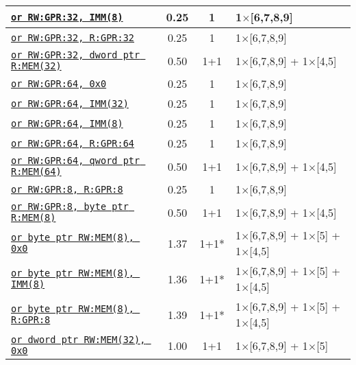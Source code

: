 \documentclass[a4paper,english,fontsize=9]{scrartcl}
\begin{document}
\begin{longtable}{p{}ccL{.25\textwidth}}
  \midrule
  \texttt{\href{https://felixcloutier.com/x86/OR.html}{or RW:GPR:32, IMM(8)}} & 0.25 & 1 & 1\(\times\)[6,7,8,9] \\
  \midrule
  \texttt{\href{https://felixcloutier.com/x86/OR.html}{or RW:GPR:32, R:GPR:32}} & 0.25 & 1 & 1\(\times\)[6,7,8,9] \\
  \midrule
  \texttt{\href{https://felixcloutier.com/x86/OR.html}{or RW:GPR:32, dword ptr R:MEM(32)}} & 0.50 & 1+1 & 1\(\times\)[6,7,8,9] + 1\(\times\)[4,5] \\
  \midrule
  \texttt{\href{https://felixcloutier.com/x86/OR.html}{or RW:GPR:64, 0x0}} & 0.25 & 1 & 1\(\times\)[6,7,8,9] \\
  \midrule
  \texttt{\href{https://felixcloutier.com/x86/OR.html}{or RW:GPR:64, IMM(32)}} & 0.25 & 1 & 1\(\times\)[6,7,8,9] \\
  \midrule
  \texttt{\href{https://felixcloutier.com/x86/OR.html}{or RW:GPR:64, IMM(8)}} & 0.25 & 1 & 1\(\times\)[6,7,8,9] \\
  \midrule
  \texttt{\href{https://felixcloutier.com/x86/OR.html}{or RW:GPR:64, R:GPR:64}} & 0.25 & 1 & 1\(\times\)[6,7,8,9] \\
  \midrule
  \texttt{\href{https://felixcloutier.com/x86/OR.html}{or RW:GPR:64, qword ptr R:MEM(64)}} & 0.50 & 1+1 & 1\(\times\)[6,7,8,9] + 1\(\times\)[4,5] \\
  \midrule
  \texttt{\href{https://felixcloutier.com/x86/OR.html}{or RW:GPR:8, R:GPR:8}} & 0.25 & 1 & 1\(\times\)[6,7,8,9] \\
  \midrule
  \texttt{\href{https://felixcloutier.com/x86/OR.html}{or RW:GPR:8, byte ptr R:MEM(8)}} & 0.50 & 1+1 & 1\(\times\)[6,7,8,9] + 1\(\times\)[4,5] \\
  \midrule
  \texttt{\href{https://felixcloutier.com/x86/OR.html}{or byte ptr RW:MEM(8), 0x0}} & 1.37 & 1+1* & 1\(\times\)[6,7,8,9] + 1\(\times\)[5] + 1\(\times\)[4,5] \\
  \midrule
  \texttt{\href{https://felixcloutier.com/x86/OR.html}{or byte ptr RW:MEM(8), IMM(8)}} & 1.36 & 1+1* & 1\(\times\)[6,7,8,9] + 1\(\times\)[5] + 1\(\times\)[4,5] \\
  \midrule
  \texttt{\href{https://felixcloutier.com/x86/OR.html}{or byte ptr RW:MEM(8), R:GPR:8}} & 1.39 & 1+1* & 1\(\times\)[6,7,8,9] + 1\(\times\)[5] + 1\(\times\)[4,5] \\
  \midrule
  \texttt{\href{https://felixcloutier.com/x86/OR.html}{or dword ptr RW:MEM(32), 0x0}} & 1.00 & 1+1 & 1\(\times\)[6,7,8,9] + 1\(\times\)[5] \\
  \midrule

\end{longtable}
\end{document}

